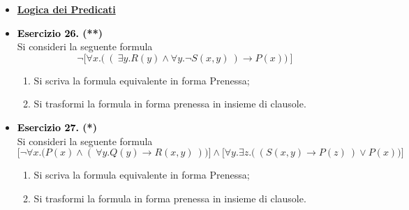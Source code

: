 \documentclass[a4paper,10pt]{article}
\begin{document}
    {\normalsize
    \begin{itemize}[label=, leftmargin=0pt]
    

    
    

    \item \textbf{\underline{Logica dei Predicati}}
    \item \textbf{\textcolor{black}{Esercizio 26.} (**)} \\ 	
    Si consideri la seguente formula 
    $$\lnot \bigg[\forall x.\bigg(\ (\  \exists y.R(y)\land \forall y.\lnot S(x,y)\ )\rightarrow P(x)\bigg)\ \bigg]$$
    \begin{enumerate}
        \item Si scriva la formula equivalente in forma Prenessa;
        \item Si trasformi la formula in forma prenessa in insieme di clausole.
    \end{enumerate}

    
    \item \textbf{\textcolor{black}{Esercizio 27.} (*)} \\ 
    Si consideri la seguente formula 
    $$\bigg[ \lnot \forall x.\bigg( P(x)\land (\ \forall y. Q(y)\rightarrow R(x,y)\ )\bigg)\bigg]\land \bigg[\forall y.\exists z.\bigg(\ (S(x,y)\rightarrow P(z)\ )\lor P(x)\bigg)\bigg]$$
    \begin{enumerate}
        \item Si scriva la formula equivalente in forma Prenessa;
        \item Si trasformi la formula in forma prenessa in insieme di clausole.\\[0.1cm]
    \end{enumerate}


\end{itemize}}
\end{document}
